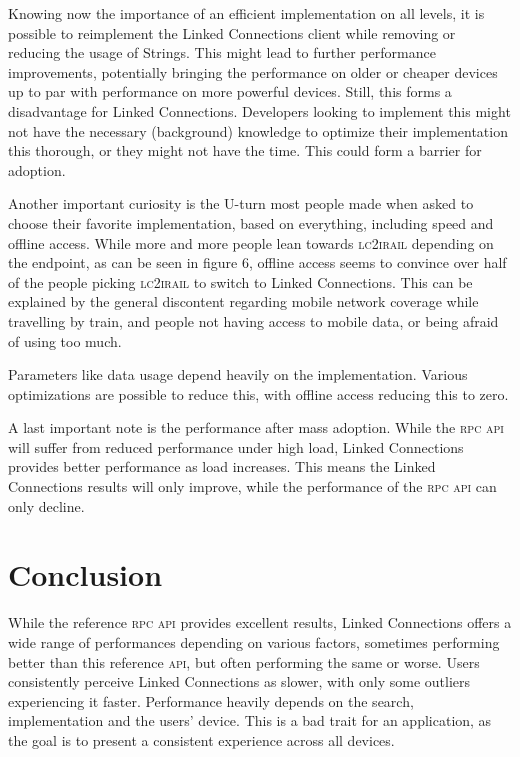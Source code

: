 \documentclass[twocolumn]{phdsymp} %
\begin{document}
Knowing now the importance of an efficient implementation on all levels, it is possible to reimplement the Linked Connections client while removing or reducing the usage of
Strings. This might lead to further performance improvements, potentially bringing the performance on older or cheaper devices up to par with performance on more powerful devices. Still, this forms a disadvantage for Linked Connections. Developers looking to implement this might not have the necessary (background) knowledge to optimize
their implementation this thorough, or they might not have the time. This could form a barrier for adoption.

Another important curiosity is the U-turn most people made when asked to choose their favorite implementation, based on everything, including speed and offline access.
While more and more people lean towards \textsc{lc2irail} depending on the endpoint, as can be seen in figure 6, offline access seems to convince over half of the people picking \textsc{lc2irail} to switch to Linked Connections. This can be explained by the general discontent regarding mobile network coverage while travelling by train, and people not having access to mobile data, or being afraid of using too much.

Parameters like data usage depend heavily on the implementation. Various optimizations are possible to reduce this, with offline access reducing this to zero.

A last important note is the performance after mass adoption. While the \textsc{rpc} \textsc{api} will suffer from reduced performance under high load, Linked Connections provides better performance as load increases. This means the Linked Connections results will only improve, while the performance of the \textsc{rpc} \textsc{api} can only decline.

\section{Conclusion}
While the reference \textsc{rpc} \textsc{api} provides excellent results, Linked Connections offers a wide range of performances depending on various factors, sometimes performing better than this reference \textsc{api}, but often performing the same or worse. Users consistently perceive Linked Connections as slower, with only some outliers experiencing it faster. Performance heavily depends on the search, implementation and the users’ device. This is a bad trait for an application, as the goal is to present a consistent experience across all devices.
\end{document}
